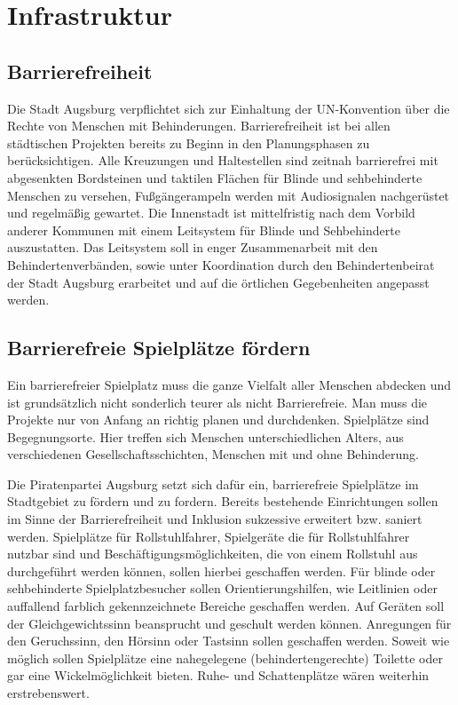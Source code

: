 \chapter{Infrastruktur}

  \section{Barrierefreiheit}
  
  Die Stadt Augsburg verpflichtet sich zur Einhaltung der UN-Konvention über 
  die Rechte von Menschen mit Behinderungen. Barrierefreiheit ist bei allen 
  städtischen Projekten bereits zu Beginn in den Planungsphasen zu 
  berücksichtigen. Alle Kreuzungen und Haltestellen sind zeitnah barrierefrei 
  mit abgesenkten Bordsteinen und taktilen Flächen für Blinde und 
  sehbehinderte Menschen zu versehen, Fußgängerampeln werden mit Audiosignalen 
  nachgerüstet und regelmäßig gewartet. Die Innenstadt ist mittelfristig nach 
  dem Vorbild anderer Kommunen mit einem Leitsystem für Blinde und 
  Sehbehinderte auszustatten. Das Leitsystem soll in enger Zusammenarbeit mit 
  den Behindertenverbänden, sowie unter Koordination durch den 
  Behindertenbeirat der Stadt Augsburg erarbeitet und auf die örtlichen 
  Gegebenheiten angepasst werden.
  
  \section{Barrierefreie Spielplätze fördern}
  
  Ein barrierefreier Spielplatz muss die ganze Vielfalt aller Menschen 
  abdecken und ist grundsätzlich nicht sonderlich teurer als nicht 
  Barrierefreie. Man muss die Projekte nur von Anfang an richtig planen und 
  durchdenken. Spielplätze sind Begegnungsorte. Hier treffen sich Menschen 
  unterschiedlichen Alters, aus verschiedenen Gesellschaftsschichten, Menschen 
  mit und ohne Behinderung.
    
  Die Piratenpartei Augsburg setzt sich dafür ein, barrierefreie Spielplätze 
  im Stadtgebiet zu fördern und zu fordern. Bereits bestehende Einrichtungen 
  sollen im Sinne der Barrierefreiheit und Inklusion sukzessive erweitert bzw. 
  saniert werden. Spielplätze für Rollstuhlfahrer, Spielgeräte die für 
  Rollstuhlfahrer nutzbar sind und Beschäftigungsmöglichkeiten, die von einem 
  Rollstuhl aus durchgeführt werden können, sollen hierbei geschaffen werden. 
  Für blinde oder sehbehinderte Spielplatzbesucher sollen Orientierungshilfen,
  wie Leitlinien oder auffallend farblich gekennzeichnete Bereiche geschaffen 
  werden. Auf Geräten soll der Gleichgewichtssinn beansprucht und geschult 
  werden können. Anregungen für den Geruchssinn, den Hörsinn oder Tastsinn 
  sollen geschaffen werden. Soweit wie möglich sollen Spielplätze eine 
  nahegelegene (behindertengerechte) Toilette oder gar eine Wickelmöglichkeit 
  bieten. Ruhe- und Schattenplätze wären weiterhin erstrebenswert.
  
